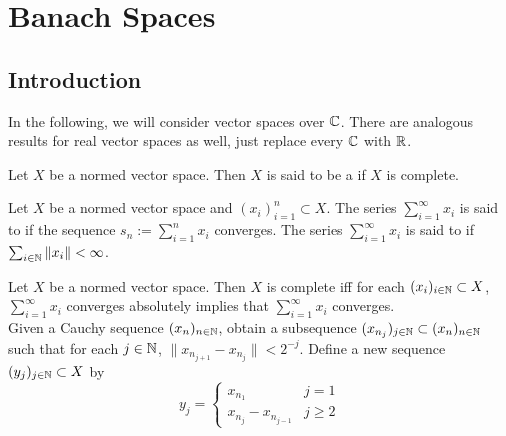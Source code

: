 \documentclass{book}
\begin{document}
 

	
	
	
	
	
	
	
	




	
	
	
	
	
	
	
	
	
	
	
	
	
	
	\newpage
	\chapter{Banach Spaces}

	\section{Introduction}
	\begin{note}
		In the following, we will consider vector spaces over $\mathbb{C}$. There are analogous results for real vector spaces as well, just replace every $\mathbb{C}$ with $\mathbb{R}$.
	\end{note}
	
	\begin{defn} \ld{}
		Let $X$ be a normed vector space. Then $X$ is said to be a  if $X$ is complete.  
	\end{defn}
	
	\begin{defn} \ld{}
		Let $X$ be a normed vector space and $(x_i)_{i=1}^n \subset X$. The series $\sum_{i =1}^{\infty}x_i$ is said to  if the sequence $s_n := \sum_{i=1}^n x_i$ converges. The series $\sum_{i =1}^{\infty}x_i$ is said to  if $\sum_{i\in \mathbb{N}}\|x_i \|< \infty$.
	\end{defn}
	
	\begin{ex} \lex{}
		Let $X$ be a normed vector space. Then $X$ is complete iff for each $(x_{i})_{i \in \mathbb{N}} \subset X$, $\sum_{i =1}^{\infty}x_i$ converges absolutely implies that $\sum_{i=1}^{\infty}x_i$ converges. \\
		 Given a Cauchy sequence $(x_n)_{n \in \mathbb{N}}$, obtain a subsequence $(x_{n_j})_{j \in \mathbb{N}} \subset (x_n)_{n \in \mathbb{N}}$ such that for each $j \in \mathbb{N}$, $\|x_{n_{j+1}} - x_{n_{j}}\| < 2^{-j}$. Define a new sequence $(y_j)_{j \in \mathbb{N}} \subset X$ by 
		\[
		y_j = 
		\begin{cases}
		x_{n_1} & j =1 \\  
		x_{n_j} - x_{n_{j-1}} & j \geq 2	
		\end{cases}
		\] 
	\end{ex}
	
\end{document}
